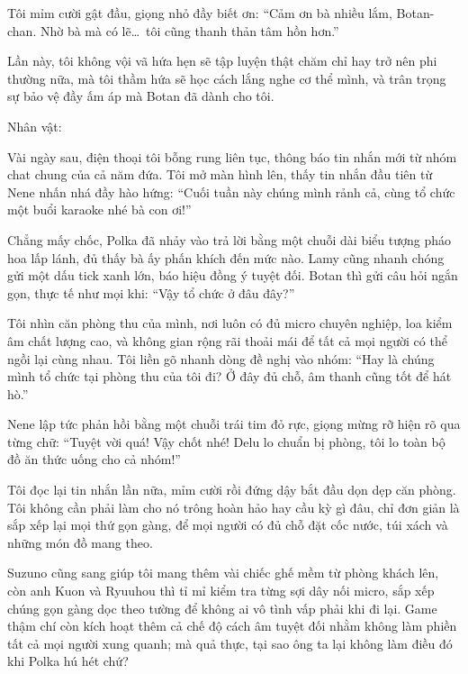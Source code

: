 \documentclass[../main.tex]{subfiles}
\begin{document}
Tôi mỉm cười gật đầu, giọng nhỏ đầy biết ơn: ``Cảm ơn bà nhiều lắm, Botan-chan. Nhờ bà mà có lẽ\dots\ tôi cũng thanh thản tâm hồn hơn.''

Lần này, tôi không vội vã hứa hẹn sẽ tập luyện thật chăm chỉ hay trở nên phi thường nữa, mà tôi thầm hứa sẽ học cách lắng nghe cơ thể mình, và trân trọng sự bảo vệ đầy ấm áp mà Botan đã dành cho tôi.

\newpage

\begin{center}
    {\caviar\fontsize{12pt}{12pt}\selectfont Nhân vật:     }
\end{center}

Vài ngày sau, điện thoại tôi bỗng rung liên tục, thông báo tin nhắn mới từ nhóm chat chung của cả năm đứa. Tôi mở màn hình lên, thấy tin nhắn đầu tiên từ Nene nhấn nhá đầy hào hứng: ``Cuối tuần này chúng mình rảnh cả, cùng tổ chức một buổi karaoke nhé bà con ơi!''

Chẳng mấy chốc, Polka đã nhảy vào trả lời bằng một chuỗi dài biểu tượng pháo hoa lấp lánh, đủ thấy bà ấy phấn khích đến mức nào. Lamy cũng nhanh chóng gửi một dấu tick xanh lớn, báo hiệu đồng ý tuyệt đối. Botan thì gửi câu hỏi ngắn gọn, thực tế như mọi khi: ``Vậy tổ chức ở đâu đây?''

Tôi nhìn căn phòng thu của mình, nơi luôn có đủ micro chuyên nghiệp, loa kiểm âm chất lượng cao, và không gian rộng rãi thoải mái để tất cả mọi người có thể ngồi lại cùng nhau. Tôi liền gõ nhanh dòng đề nghị vào nhóm: ``Hay là chúng mình tổ chức tại phòng thu của tôi đi? Ở đây đủ chỗ, âm thanh cũng tốt để hát hò.''

Nene lập tức phản hồi bằng một chuỗi trái tim đỏ rực, giọng mừng rỡ hiện rõ qua từng chữ: ``Tuyệt vời quá! Vậy chốt nhé! Delu lo chuẩn bị phòng, tôi lo toàn bộ đồ ăn thức uống cho cả nhóm!''

Tôi đọc lại tin nhắn lần nữa, mỉm cười rồi đứng dậy bắt đầu dọn dẹp căn phòng. Tôi không cần phải làm cho nó trông hoàn hảo hay cầu kỳ gì đâu, chỉ đơn giản là sắp xếp lại mọi thứ gọn gàng, để mọi người có đủ chỗ đặt cốc nước, túi xách và những món đồ mang theo.

Suzuno cũng sang giúp tôi mang thêm vài chiếc ghế mềm từ phòng khách lên, còn anh Kuon và Ryuuhou thì tỉ mỉ kiểm tra từng sợi dây nối micro, sắp xếp chúng gọn gàng dọc theo tường để không ai vô tình vấp phải khi đi lại. Game thậm chí còn kích hoạt thêm cả chế độ cách âm tuyệt đối nhằm không làm phiền tất cả mọi người xung quanh; mà quả thực, tại sao ông ta lại không làm điều đó khi Polka hú hét chứ?
\end{document}
